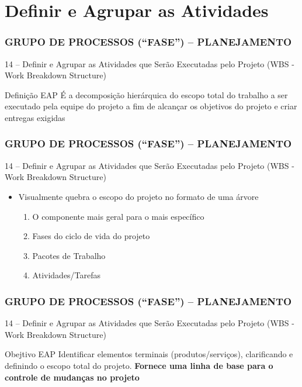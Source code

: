\section{Definir e Agrupar as Atividades}

\begin{frame}
 \frametitle{GRUPO DE PROCESSOS (“FASE”) – PLANEJAMENTO}
   14 – Definir e Agrupar as Atividades que Serão Executadas pelo Projeto (WBS -  Work Breakdown Structure)
  \begin{block}{Definição EAP}
 É a decomposição hierárquica do escopo total do trabalho a ser executado pela equipe do projeto a fim
 de alcançar os objetivos do projeto e criar entregas exigidas
  \end{block}
\end{frame}

\begin{frame}
 \frametitle{GRUPO DE PROCESSOS (“FASE”) – PLANEJAMENTO}
   14 – Definir e Agrupar as Atividades que Serão Executadas pelo Projeto (WBS -  Work Breakdown Structure)
  \begin{itemize}
   \item Visualmente quebra o escopo do projeto no formato de uma árvore
   \begin{enumerate}
    \item O componente mais geral para o mais específico
    \item Fases do ciclo de vida do projeto
    \item Pacotes de Trabalho
    \item Atividades/Tarefas
   \end{enumerate}
  \end{itemize}
\end{frame}

\begin{frame}
 \frametitle{GRUPO DE PROCESSOS (“FASE”) – PLANEJAMENTO}
   14 – Definir e Agrupar as Atividades que Serão Executadas pelo Projeto (WBS -  Work Breakdown Structure)
  \begin{block}{Obejtivo EAP}
 Identificar elementos terminais (produtos/serviços), clarificando e definindo o escopo total do projeto. \textbf{Fornece uma linha de base
 para o controle de mudanças no projeto}
  \end{block}
\end{frame}

